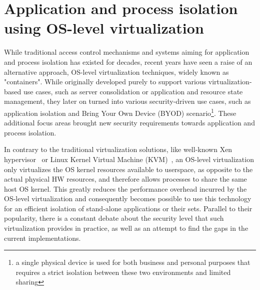 \section{Application and process isolation using OS-level virtualization}

While traditional access control mechanisms and systems aiming for application and process isolation has existed for decades, recent years have seen a raise of an alternative approach, OS-level virtualization techniques, widely known as "containers". While originally developed purely to support various virtualization-based use cases, such as server consolidation or application and resource state management, they later on turned into various security-driven use cases, such as application isolation and Bring Your Own Device (BYOD) scenario\footnote{a single physical device is used for both business and personal purposes that requires a strict isolation between these two environments and limited sharing}. These additional focus areas brought new security requirements towards application and process isolation.

In contrary to the traditional virtualization solutions, like well-known Xen hypervisor~\cite{xenproject} or Linux Kernel Virtual Machine (KVM)~\cite{kvmproject}, an OS-level virtualization only virtualizes the OS kernel resources available to userspace, as opposite to the actual physical HW resources, and therefore allows processes to share the same host OS kernel. This greatly reduces the performance overhead incurred by the OS-level virtualization and consequently becomes possible to use this technology for an efficient isolation of stand-alone applications or their sets. Parallel to their popularity, there is a constant debate about the security level that such virtualization provides in practice, as well as an attempt to find the gaps in the current implementations. 


